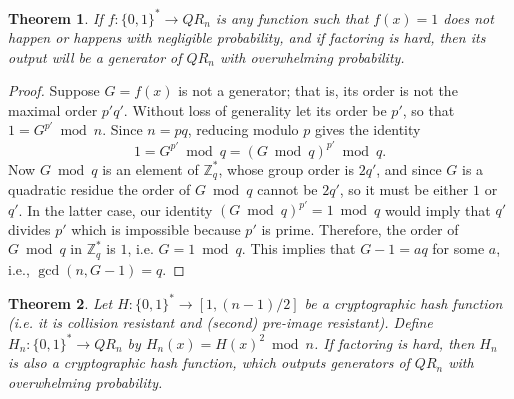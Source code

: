 \documentclass[a4paper,12pt]{article}
\newtheorem{theorem}{Theorem}
\newcommand{\Z}{\mathbb{Z}}
\begin{document}
\begin{theorem}
If $f: \{0,1\}^* \to QR_n$ is any function such that $f(x) = 1$ does not happen or happens with negligible probability, and if factoring is hard, then its output will be a generator of $QR_n$ with overwhelming probability.
\end{theorem}

\begin{proof}
Suppose $G = f(x)$ is not a generator; that is, its order is not the maximal order $p'q'$. Without loss of generality let its order be $p'$, so that $1 = G^{p'} \bmod n$. Since $n = pq$, reducing modulo $p$ gives the identity 
\[ 1 = G^{p'} \bmod q = (G \bmod q)^{p'} \bmod q. \]
Now $G \bmod q$ is an element of $\Z^*_q$, whose group order is $2q'$, and since $G$ is a quadratic residue the order of $G \bmod q$ cannot be $2q'$, so it must be either $1$ or $q'$. In the latter case, our identity $(G \bmod q)^{p'} = 1 \bmod q$ would imply that $q'$ divides $p'$ which is impossible because $p'$ is prime. Therefore, the order of $G \bmod q$ in $\Z^*_q$ is $1$, i.e. $G = 1 \bmod q$. This implies that $G - 1 = aq$ for some $a$, i.e., $\gcd(n, G-1) = q$.
\end{proof}

\begin{theorem}
Let $H: \{0,1\}^* \to [1, (n-1)/2]$ be a cryptographic hash function (i.e. it is collision resistant and (second) pre-image resistant). Define $H_n : \{0,1\}^* \to QR_n$ by $H_n(x) = H(x)^2 \bmod n$. If factoring is hard, then $H_n$ is also a cryptographic hash function, which outputs generators of $QR_n$ with overwhelming probability.
\end{theorem}
\end{document}
